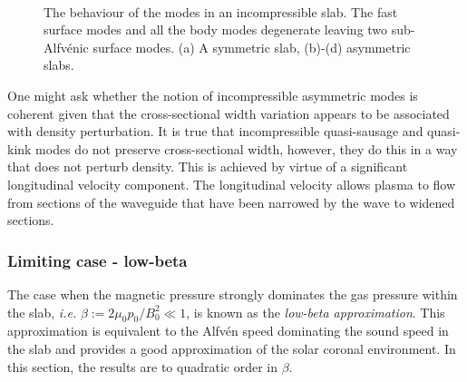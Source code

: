 \begin{figure}
	\centering
	 \\
	\caption{The behaviour of the modes in an incompressible slab. The fast surface modes and all the body modes degenerate leaving two sub-Alfv\'{e}nic surface modes. (a) A symmetric slab, (b)-(d) asymmetric slabs.}
\end{figure}

One might ask whether the notion of incompressible asymmetric modes is coherent given that the cross-sectional width variation appears to be associated with density perturbation. It is true that incompressible quasi-sausage and quasi-kink modes do not preserve cross-sectional width, however, they do this in a way that does not perturb density. This is achieved by virtue of a significant longitudinal velocity component. The longitudinal velocity allows plasma to flow from sections of the waveguide that have been narrowed by the wave to widened sections.


\subsubsection{Limiting case - low-beta} \label{sec: zero-beta}

The case when the magnetic pressure strongly dominates the gas pressure within the slab, \textit{i.e.} $\beta := 2\mu_0{p_0}/B_0^2 \ll 1$, is known as the \textit{low-beta approximation}. This approximation is equivalent to the Alfv\'{e}n speed dominating the sound speed in the slab and provides a good approximation of the solar coronal environment. In this section, the results are to quadratic order in $\beta$.

